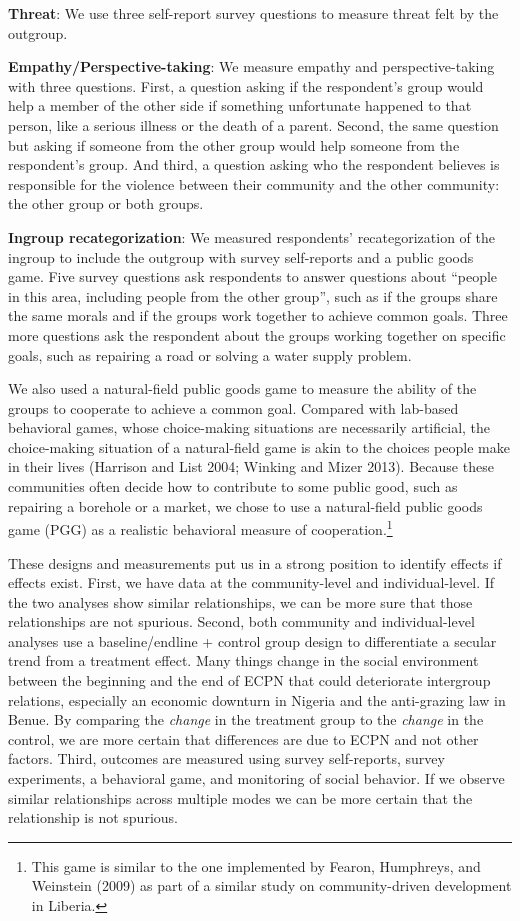 \documentclass[11pt]{article}
\begin{document}
\textbf{Threat}: We use three self-report survey questions to measure
threat felt by the outgroup.

\textbf{Empathy/Perspective-taking}: We measure empathy and
perspective-taking with three questions. First, a question asking if the
respondent's group would help a member of the other side if something
unfortunate happened to that person, like a serious illness or the death
of a parent. Second, the same question but asking if someone from the
other group would help someone from the respondent's group. And third, a
question asking who the respondent believes is responsible for the
violence between their community and the other community: the other
group or both groups.

\textbf{Ingroup recategorization}: We measured respondents'
recategorization of the ingroup to include the outgroup with survey
self-reports and a public goods game. Five survey questions ask
respondents to answer questions about ``people in this area, including
people from the other group'', such as if the groups share the same
morals and if the groups work together to achieve common goals. Three
more questions ask the respondent about the groups working together on
specific goals, such as repairing a road or solving a water supply
problem.

We also used a natural-field public goods game to measure the ability of
the groups to cooperate to achieve a common goal. Compared with
lab-based behavioral games, whose choice-making situations are
necessarily artificial, the choice-making situation of a natural-field
game is akin to the choices people make in their lives (Harrison and
List 2004; Winking and Mizer 2013). Because these communities often
decide how to contribute to some public good, such as repairing a
borehole or a market, we chose to use a natural-field public goods game
(PGG) as a realistic behavioral measure of cooperation.\footnote{This
  game is similar to the one implemented by Fearon, Humphreys, and
  Weinstein (2009) as part of a similar study on community-driven
  development in Liberia.}

These designs and measurements put us in a strong position to identify
effects if effects exist. First, we have data at the community-level and
individual-level. If the two analyses show similar relationships, we can
be more sure that those relationships are not spurious. Second, both
community and individual-level analyses use a baseline/endline + control
group design to differentiate a secular trend from a treatment effect.
Many things change in the social environment between the beginning and
the end of ECPN that could deteriorate intergroup relations, especially
an economic downturn in Nigeria and the anti-grazing law in Benue. By
comparing the \emph{change} in the treatment group to the \emph{change}
in the control, we are more certain that differences are due to ECPN and
not other factors. Third, outcomes are measured using survey
self-reports, survey experiments, a behavioral game, and monitoring of
social behavior. If we observe similar relationships across multiple
modes we can be more certain that the relationship is not spurious.
\end{document}
